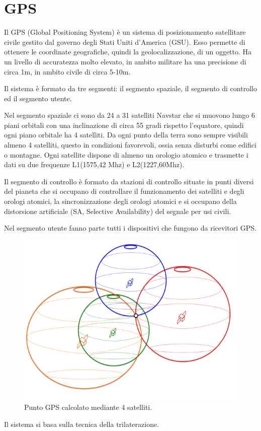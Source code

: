 \documentclass[12pt,a4paper,openright,twoside]{report}
\begin{document}
\section{GPS}
Il GPS (Global Positioning System) è un sistema di posizionamento satellitare civile gestito dal governo degli Stati Uniti d'America (GSU). Esso permette di ottenere le coordinate geografiche, quindi la geolocalizzazione, di un oggetto.
Ha un livello di accuratezza molto elevato, in ambito militare ha una precisione di circa 1m, in ambito civile di circa 5-10m.

Il sistema è formato da tre segmenti: il segmento spaziale, il segmento di controllo ed il segmento utente. \cite{K15}


Nel segmento spaziale ci sono da 24 a 31 satelliti Navstar che si muovono lungo 6 piani orbitali con una inclinazione di circa 55 gradi rispetto l'equatore, quindi ogni piano orbitale ha 4 satelliti. Da ogni punto della terra sono sempre visibili almeno 4 satelliti, questo in condizioni favorevoli, ossia senza disturbi come edifici o montagne. Ogni satellite dispone di almeno un orologio atomico e trasmette i dati su due frequenze L1(1575,42 Mhz) e L2(1227,60Mhz).


Il segmento di controllo è formato da stazioni di controllo situate in punti diversi del pianeta che si occupano di controllare il funzionamento dei satelliti e degli orologi atomici, la sincronizzazione degli orologi atomici e si occupano della distorsione artificiale (SA, Selective Availability) del segnale per usi civili.


Nel segmento utente fanno parte tutti i dispositivi che fungono da ricevitori GPS.
\begin{figure}[h!]
\centering 
\includegraphics[scale=0.6]{fig8} 
\caption{Punto GPS calcolato mediante 4 satelliti. \cite{K16}} 
\end{figure}
Il sistema si basa sulla tecnica della trilaterazione. 
\end{document}
